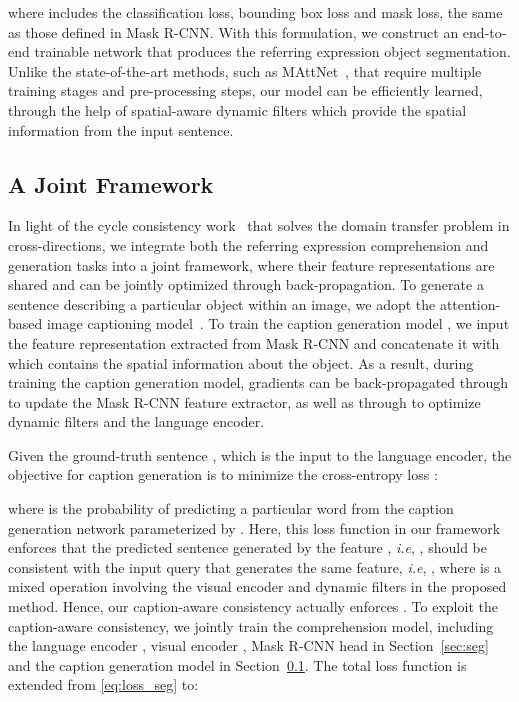 \documentclass{bmvc2k}
\def\ie{\emph{i.e}\bmvaOneDot}
\begin{document}
where  includes the classification loss, bounding box loss and mask loss, the same as 
those
defined in Mask R-CNN.
With this formulation, we construct an end-to-end trainable network that produces the referring expression object segmentation.
Unlike the state-of-the-art methods, such as MAttNet~\cite{Yu_CVPR_2018}, that require multiple training stages and pre-processing steps, our model can be efficiently learned, through the help of spatial-aware dynamic filters which provide the spatial information from the input sentence.
\subsection{A Joint Framework}
\label{sec:cap}
In light of the cycle consistency work~\cite{Zhu_ICCV_2017} that solves the domain transfer problem in cross-directions, we integrate both the referring expression comprehension and generation tasks into a joint framework, where their feature representations are shared and can be jointly optimized through back-propagation.
{}
To generate a sentence describing a particular object within an image, we adopt the attention-based image captioning model~\cite{Xu_ICML_2015}.
To train the caption generation model , we input the feature representation  extracted from Mask R-CNN and concatenate it with  which contains the spatial information about the object.
As a result, during training the caption generation model, gradients can be back-propagated through  to update the Mask R-CNN feature extractor, as well as through  to optimize dynamic filters and the language encoder.


{}
Given the ground-truth sentence , which is the input to the language encoder, the objective for caption generation is to minimize the cross-entropy loss :

where  is the probability of predicting a particular word from the caption generation network parameterized by .
Here, this loss function in our framework enforces that the predicted sentence  generated by the feature , \ie, , should be consistent with the input query  that generates the same feature, \ie, , where  is a mixed operation involving the visual encoder  and dynamic filters in the proposed method.
Hence, our caption-aware consistency actually enforces .
{}
\label{sec:full}
To exploit the caption-aware consistency, we jointly train the comprehension model, including the language encoder , visual encoder , Mask R-CNN head  in Section~\ref{sec:seg} and the caption generation model  in Section~\ref{sec:cap}.
The total loss function is extended from \eqref{eq:loss_seg} to:
\end{document}
